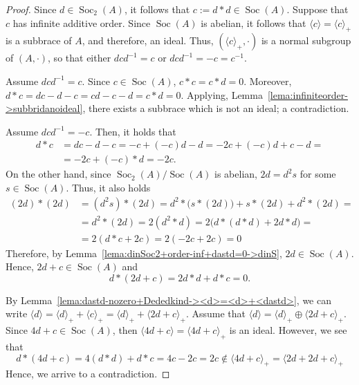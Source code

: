 \documentclass[12pt, a4paper, english]{article}
\theoremstyle{definition}
\DeclareMathOperator{\Soc}{Soc}
\begin{document}
\begin{proof}
Since $d \in \Soc_2(A)$, it follows that $c:= d \ast d \in \Soc(A)$. Suppose that $c$ has infinite additive order. %
Since $\Soc(A)$ is abelian, it follows that $\langle c \rangle = \langle c \rangle_+$ is a subbrace of $A$, and therefore, an ideal. Thus, $(\langle c \rangle_+,\cdot)$ is a normal subgroup of $(A, \cdot)$, so that either $dcd^{-1} = c$ or $dcd^{-1} = -c = c^{-1}$.

Assume $dcd^{-1} = c$. Since $c\in \Soc(A)$, $c \ast c = c \ast d = 0$. Moreover, $d \ast c = dc -d -c = cd -c - d = c\ast d = 0$. Applying, Lemma~\ref{lema:infiniteorder->subbridanoideal}, there exists a subbrace which is not an ideal; a contradiction.

Assume $dcd^{-1} = -c$. Then, it holds that 
\begin{align*}
d \ast c & = dc -d - c = -c + (-c)d -d  = -2c + (-c)d + c - d =\\
& = -2c + (-c)\ast d = -2c.
\end{align*}
On the other hand, since $\Soc_2(A)/\Soc(A)$ is abelian, $2d = d^2s$ for some $s \in \Soc(A)$. Thus, it also holds
\begin{align*}
(2d) \ast (2d) & = (d^2s) \ast (2d) = d^2 \ast \big(s \ast (2d)\big) + s \ast (2d) + d^2 \ast (2d) = \\
& =  d^2 \ast (2d) = 2(d^2 \ast d) = 2\big(d \ast (d \ast d) + 2d \ast d\big) = \\
& = 2(d \ast c + 2c) = 2(-2c + 2c) = 0
\end{align*}
Therefore, by Lemma~\ref{lema:dinSoc2+order-inf+dastd=0->dinS}, $2d\in \Soc(A)$. Hence, $2d + c \in \Soc(A)$ and 
\[ d \ast (2d + c) = 2d \ast d + d \ast c = 0.\]

By Lemma~\ref{lema:dastd-nozero+Dededkind-><d>=<d>+<dastd>}, we can write $\langle d \rangle = \langle d \rangle_+ + \langle c \rangle_+ = \langle d \rangle_+ + \langle 2d + c \rangle_+$. Assume that $\langle d \rangle = \langle d \rangle_+ \oplus \langle 2d + c\rangle_+$. Since $4d+c\in \Soc(A)$, then $\langle 4d +c \rangle = \langle 4d+c \rangle_+$ is an ideal. However, we see that
\[ d \ast (4d + c) = 4(d \ast d) + d \ast c = 4c - 2c = 2c \notin \langle 4d + c \rangle_+ = \langle 2d + 2d+c\rangle_+\]
Hence, we arrive to a contradiction.


\end{proof}
\end{document}
